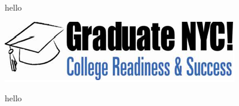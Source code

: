 \documentclass{article}
\begin{document}
hello

\includegraphics{GNYC_Logo.png}

hello 
\end{document}
